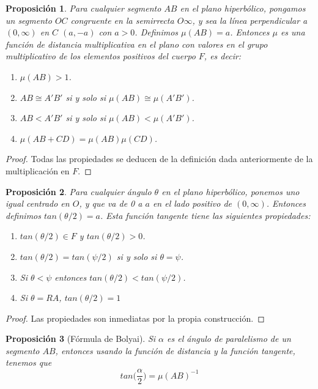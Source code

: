 \documentclass[a4paper]{amsart}
\theoremstyle{plain}
\newtheorem{proposition}{Proposición}
\begin{document}
\begin{proposition}
Para cualquier segmento $AB$ en el plano hiperbólico, pongamos un segmento $OC$ congruente en la semirrecta $O\infty$, y sea la línea perpendicular a $(0,\infty)$ en $C$ $(a,-a)$ con $a>0$. Definimos $\mu (AB)=a$. Entonces $\mu$ es una función de distancia multiplicativa en el plano con valores en el grupo multiplicativo de los elementos positivos del cuerpo $F$, es decir:
\begin{enumerate}
\item [(a)] $\mu (AB)>1$.
\item [(b)] $AB\cong A'B'$ si y solo si $\mu (AB)\cong\mu (A'B')$.
\item [(c)] $AB< A'B'$ si y solo si $\mu (AB)<\mu (A'B')$.
\item [(d)] $\mu (AB+CD)=\mu(AB) \mu(CD)$.
\end{enumerate}
\end{proposition}

\begin{proof}
Todas las propiedades se deducen de la definición dada anteriormente de la multiplicación en $F$.
\end{proof}

\begin{proposition}
Para cualquier ángulo $\theta$ en el plano hiperbólico, ponemos uno igual centrado en $O$, y que va de 0 a $a$ en el lado positivo de $(0,\infty)$. Entonces definimos $tan(\theta /2)=a$. Esta función tangente tiene las siguientes propiedades:
\begin{enumerate}
\item [(a)] $tan(\theta /2)\in F$ y $tan(\theta /2)>0$.
\item [(b)] $tan(\theta /2)=tan(\psi /2)$ si y solo si $\theta=\psi$.
\item [(c)] Si $\theta<\psi$ entonces $tan(\theta /2)<tan(\psi /2)$.
\item [(d)] Si $\theta=RA$, $tan(\theta /2)=1$
\end{enumerate}
\end{proposition}

\begin{proof}
Las propiedades son inmediatas por la propia construcción.
\end{proof}

\begin{proposition}[Fórmula de Bolyai]
Si $\alpha$ es el ángulo de paralelismo de un segmento $AB$, entonces usando la función de distancia y la función tangente, tenemos que
\[
tan\big(\frac{\alpha}{2}\big)=\mu(AB)^{-1}
\]
\end{proposition}
\end{document}
